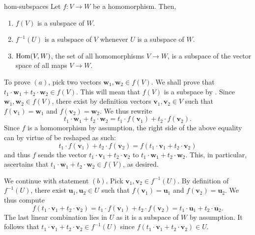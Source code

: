 \begin{lemma}{}{hom-subspaces}
 Let $f:V \to W$ be a homomorphism. Then,
 \begin{enumerate}[label=(\alph*)]
  \item $f(V)$ is a subspace of $W$.
  \item $f^{-1}(U)$ is a subspace of $V$ whenever $U$ is a subspace of $W$.
  \item $\operatorname{Hom}(V,W)$, the set of all homomorphisms $V \to W$, is a subspace of
   the vector space of all maps $V \to W$.
 \end{enumerate}
\end{lemma}
\begin{lemproof}
 To prove $(a)$, pick two vectors $\mathbf{w}_1,\mathbf{w}_2 \in f(V)$. We shall
 prove that $t_1 \cdot \mathbf{w}_1 + t_2 \cdot \mathbf{w}_2 \in f(V)$. This
 will mean that $f(V)$ is a subspace by
 . Since
 $\mathbf{w}_1,\mathbf{w}_2 \in f(V)$, there exist by definition vectors
 $\mathbf{v}_1,\mathbf{v}_2 \in V$ such that $f(\mathbf{v}_1) = \mathbf{w}_1$
 and $f(\mathbf{v}_2) = \mathbf{w}_2$. We thus rewrite
 \[
  t_1 \cdot \mathbf{w}_1 + t_2 \cdot \mathbf{w}_2 = t_1 \cdot f(\mathbf{v}_1) +
  t_2 \cdot f(\mathbf{v}_2).
 \]
 Since $f$ is a homomorphism by assumption, the right side of the above equality
 can by virtue of  be reshaped as such:
 \[
  t_1 \cdot f(\mathbf{v}_1) + t_2 \cdot f(\mathbf{v}_2) = f(t_1 \cdot
  \mathbf{v}_1 + t_2 \cdot \mathbf{v}_2)
 \]
 and thus $f$ sends the vector $t_1 \cdot \mathbf{v}_1 + t_2 \cdot \mathbf{v}_2$
 to $t_1 \cdot \mathbf{w}_1 + t_2 \cdot \mathbf{w}_2$. This, in particular,
 ascertains that $t_1 \cdot \mathbf{w}_1 + t_2 \cdot \mathbf{w}_2 \in f(V)$, as
 desired.

 We continue with statement $(b)$. Pick $\mathbf{v}_1,\mathbf{v}_2 \in
 f^{-1}(U)$. By definition of $f^{-1}(U)$, there exist
 $\mathbf{u}_1,\mathbf{u}_2 \in U$ such that $f(\mathbf{v}_1) = \mathbf{u}_1$
 and $f(\mathbf{v}_2) = \mathbf{u}_2$. We thus compute
 \[
  f(t_1 \cdot \mathbf{v}_1 + t_2 \cdot \mathbf{v}_2) = t_1 \cdot f(\mathbf{v}_1)
  + t_2 \cdot f(\mathbf{v}_2) = t_1 \cdot \mathbf{u}_1 + t_2 \cdot \mathbf{u}_2.
 \]
 The last linear combination lies in $U$ as it is a subspace of $W$ by
 assumption. It follows that $t_1 \cdot \mathbf{v}_1 + t_2 \cdot \mathbf{v}_2
 \in f^{-1}(U)$ since $f(t_1 \cdot \mathbf{v}_1 + t_2 \cdot \mathbf{v}_2) \in
 U$.


\end{lemproof}
